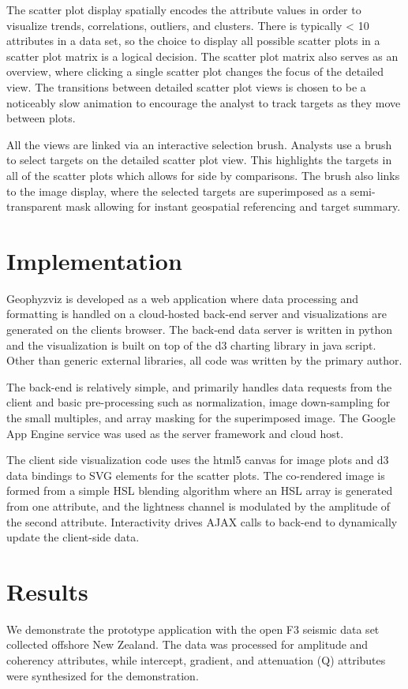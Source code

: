 \documentclass[journal]{vgtc}                %
\begin{document}
The scatter plot display spatially encodes the attribute values in order to visualize trends,
correlations, outliers, and clusters. There is typically < 10 attributes in a data set, so
the choice to display all possible scatter plots in a scatter plot matrix is a logical decision.
The scatter plot matrix also serves as an overview, where clicking a single scatter plot changes the
focus of the detailed view. The transitions between detailed scatter plot views is chosen to be
a noticeably slow animation to encourage the analyst to track targets as they move between plots.

All the views are linked via an interactive selection brush. Analysts use a brush to
select targets on the detailed scatter plot view. This highlights the targets in all of
the scatter plots which allows for side by comparisons. The brush also links to the image display,
where the selected targets are superimposed as a semi-transparent mask allowing for instant
geospatial referencing and target summary.

\section{Implementation}
Geophyzviz is developed as a web application where data processing and formatting
is handled on a cloud-hosted back-end server and visualizations are generated
on the clients browser. The back-end data server is written in python and the visualization
is built on top of the d3 charting library in java script. Other than generic external libraries,
all code was written by the primary author.

The back-end is relatively simple, and primarily handles data requests from the client and
basic pre-processing such as normalization, image down-sampling for the small multiples, and array masking
for the superimposed image. The Google App Engine service was used as the server framework and cloud host.

The client side visualization code uses the html5 canvas for image plots and 
d3 data bindings to SVG elements for the scatter plots. The co-rendered image is formed from
a simple HSL blending algorithm where an HSL array is generated from one attribute,
and the lightness channel is modulated by the amplitude of the second attribute. Interactivity
drives AJAX calls to back-end to dynamically update the client-side data.

\section{Results}
We demonstrate the prototype application with the open F3 seismic data set collected offshore New
Zealand. The data was processed for amplitude and coherency attributes, while intercept,
gradient, and attenuation (Q) attributes were synthesized for the demonstration.
\end{document}
